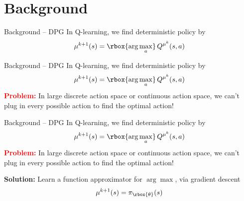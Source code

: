 \section{Background}
\begin{frame}{Background -- DPG}
In Q-learning, we find deterministic policy by
\[
\mu^{k+1}(s) = \rbox{\arg\max_{a}}\, Q^{\mu^{k}}(s, a)
\]
\end{frame}

\begin{frame}{Background -- DPG}
In Q-learning, we find deterministic policy by
\[
\mu^{k+1}(s) = \rbox{\arg\max_{a}}\, Q^{\mu^{k}}(s, a)
\]
\textcolor{red}{\textbf{Problem:}} In large discrete action space or continuous action space, we can't plug in every possible action to find the optimal action!
\end{frame}

\begin{frame}{Background -- DPG}
In Q-learning, we find deterministic policy by
\[
\mu^{k+1}(s) = \rbox{\arg\max_{a}}\, Q^{\mu^{k}}(s, a)
\]
\textcolor{red}{\textbf{Problem:}} In large discrete action space or continuous action space, we can't plug in every possible action to find the optimal action!

\textcolor{green!50!black}{\textbf{Solution:}} Learn a function approximator for $\arg\max$, via gradient descent
\[
\mu^{k+1}(s) = \pi_{\rbox{\theta}}(s)
\]
\end{frame}
